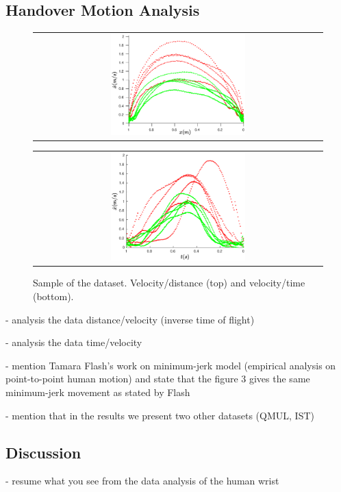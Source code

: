 \subsection{Handover Motion Analysis}

    \begin{figure}
        \centering
        \begin{tabular}{@{}c@{}}
            \centering
            \includegraphics[width=0.48\textwidth,height=0.25\textheight]{Images/vel_distance_plot.eps}
        \end{tabular}
        \baselineskip
        \begin{tabular}{@{}c@{}}
            \centering 
            \includegraphics[width=0.48\textwidth,height=0.25\textheight]{Images/vel_time_plot.eps}
        \end{tabular}
        \caption{Sample of the dataset. Velocity/distance (top) and velocity/time (bottom).}
        \label{fig:vel_distance_time}
    \end{figure}

- analysis the data distance/velocity (inverse time of flight)

- analysis the data time/velocity

- mention Tamara Flash's work on minimum-jerk model (empirical analysis on point-to-point human motion) and state that the figure 3 gives the same minimum-jerk movement as stated by Flash

- mention that in the results we present two other datasets (QMUL, IST)

\subsection{Discussion}

- resume what you see from the data analysis of the human wrist

